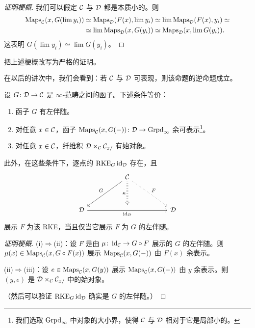 
\begin{proof}[证明梗概]
我们可以假定 $\mathcal{C}$ 与 $\mathcal{D}$ 都是本质小的。则
\[
\begin{aligned}
\operatorname{Maps}_{\mathcal{C}}(x,G(\lim y_i))&\simeq\operatorname{Maps}_{\mathcal{D}}(F(x),\lim y_i)\simeq\lim\operatorname{Maps}_{\mathcal{D}}(F(x),y_i)\simeq\\
&\simeq\lim\operatorname{Maps}_{\mathcal{D}}(x,G(y_i))\simeq\operatorname{Maps}_{\mathcal{D}}(x,\lim G(y_i)).
\end{aligned}
\]
这表明 $G(\lim y_i)\simeq\lim G(y_i)$。
\end{proof}

\begin{exercise}\label{L12-2.2}
把上述梗概改写为严格的证明。
\end{exercise}

\begin{remark}\label{L12-2.3}
在以后的讲次中，我们会看到：若 $\mathcal{C}$ 与 $\mathcal{D}$ 可表现，则该命题的逆命题成立。
\end{remark}

\begin{proposition}\label{L12-2.4}
设 $G\colon\mathcal{D}\to\mathcal{C}$ 是 $\infty$-范畴之间的函子。下述条件等价：
\begin{enumerate}[label=(\roman*),leftmargin=2.6em,itemsep=0.2em]
\item 函子 $G$ 有左伴随。
\item 对任意 $x\in\mathcal{C}$，函子 $\operatorname{Maps}_{\mathcal{C}}(x,G(-))\colon\mathcal{D}\to\operatorname{Grpd}_{\infty}$ 余可表示\footnote{我们选取 $\operatorname{Grpd}_{\infty}$ 中对象的大小界，使得 $\mathcal{C}$ 与 $\mathcal{D}$ 相对于它是局部小的。}。
\item 对任意 $x\in\mathcal{C}$，纤维积 $\mathcal{D}\times_{\mathcal{C}}\mathcal{C}_{x/}$ 有始对象。
\end{enumerate}
此外，在这些条件下，逐点的 $\mathrm{RKE}_{G}\operatorname{id}_{\mathcal{D}}$ 存在，且
\[
\begin{tikzcd}[column sep=5em,row sep=3.4em]
& \cC \arrow[dl,"G"'] \arrow[dr,dotted,"F"] \arrow[d,dotted,Rightarrow,"{\kappa}"'] & \\
\cD \arrow[rr,"\id_{\cD}"'] & \phantom{\cD} & \cD
\end{tikzcd}
\]
展示 $F$ 为该 RKE，当且仅当它展示 $F$ 为 $G$ 的左伴随。
\end{proposition}

\begin{proof}[证明梗概]
(i)$\Rightarrow$(ii)：设 $F$ 是由 $\mu\colon\operatorname{id}_{\mathcal{C}}\to G\circ F$ 展示的 $G$ 的左伴随。则 $\mu(x)\in\operatorname{Maps}_{\mathcal{C}}(x,G\circ F(x))$ 展示 $\operatorname{Maps}_{\mathcal{C}}(x,G(-))$ 由 $F(x)$ 余表示。

(ii)$\Rightarrow$(iii)：设 $e\in\operatorname{Maps}_{\mathcal{C}}(x,G(y))$ 展示 $\operatorname{Maps}_{\mathcal{C}}(x,G(-))$ 由 $y$ 余表示。则 $(y,e)$ 是 $\mathcal{D}\times_{\mathcal{C}}\mathcal{C}_{x/}$ 中的始对象。

（然后可以验证 $\mathrm{RKE}_{G}\operatorname{id}_{\mathcal{D}}$ 确实是 $G$ 的左伴随。）
\end{proof}

